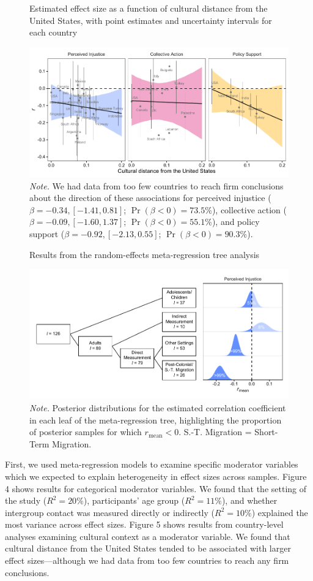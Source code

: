 \documentclass[12pt, letterpaper]{article}
\begin{document}
\begin{figure}
\centering
\caption{Estimated effect size as a function of cultural distance from the United States, with point estimates and uncertainty intervals for each country}
\includegraphics[scale=1]{../figures/figure-5}
\caption*{\textit{Note.} We had data from too few countries to reach firm conclusions about the direction of these associations for perceived injustice ($\beta = -0.34, [-1.41, 0.81]$; $\Pr (\beta < 0) = 73.5\%$), collective action ($\beta = -0.09, [-1.60, 1.37]$; $\Pr (\beta < 0) = 55.1\%$), and policy support ($\beta = -0.92, [-2.13, 0.55]$; $\Pr (\beta < 0) = 90.3\%$).}
\label{fig:f5}
\end{figure}
\begin{figure}
\centering
\caption{Results from the random-effects meta-regression tree analysis}
\includegraphics[scale=1]{../figures/figure-6}
\caption*{\textit{Note.} Posterior distributions for the estimated correlation coefficient in each leaf of the meta-regression tree, highlighting the proportion of posterior samples for which $r_\text{mean} < 0$.  S.-T. Migration = Short-Term Migration.}
\label{fig:f6}
\end{figure}

First, we used meta-regression models to examine specific moderator
variables which we expected to explain heterogeneity in effect sizes
across samples. Figure 4 shows results for categorical moderator
variables. We found that the setting of the study (\(R^2 = 20\%\)),
participants' age group (\(R^2 = 11\%\)), and whether intergroup contact
was measured directly or indirectly (\(R^2 = 10\%\)) explained the most
variance across effect sizes. Figure 5 shows results from country-level
analyses examining cultural context as a moderator variable. We found
that cultural distance from the United States tended to be associated
with larger effect sizes---although we had data from too few countries
to reach any firm conclusions.
\end{document}
